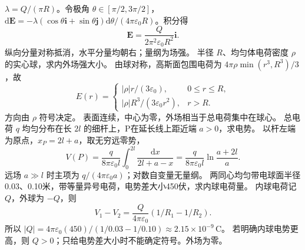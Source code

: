 \workings $\lambda=Q/(\pi R)$。令极角 $\theta\in[\pi/2,3\pi/2]$，$\mathrm d\bm E=-\lambda(\cos\theta\bm i+\sin\theta\bm j)\mathrm d\theta/(4\pi\varepsilon_0R)$。积分得
\[
\bm E=\frac{Q}{2\pi^2\varepsilon_0R^2}\bm i.
\]
\crosscheck 纵向分量对称抵消，水平分量均朝右；量纲为场强。
\problemtext 半径 $R$、均匀体电荷密度 $\rho$ 的实心球，求内外场强大小。
\workings 由球对称，高斯面包围电荷为 $4\pi\rho\min(r^3,R^3)/3$，故
\[
E(r)=\begin{cases}|\rho|r/(3\varepsilon_0),&0\le r\le R,\\
|\rho|R^3/(3\varepsilon_0r^2),&r>R.\end{cases}
\]
方向由 $\rho$ 符号决定。
\crosscheck 表面连续，中心为零，外场相当于总电荷集中在球心。
\problemtext 总电荷 $q$ 均匀分布在长 $2l$ 的细杆上，P在延长线上距近端 $a>0$，求电势。
\workings 以杆左端为原点，$x_P=2l+a$，取无穷远零势，
\[
V(P)=\frac{q}{8\pi\varepsilon_0l}\int_0^{2l}\frac{\mathrm dx}{2l+a-x}
=\frac{q}{8\pi\varepsilon_0l}\ln\frac{a+2l}{a}.
\]
\crosscheck 远场 $a\gg l$ 时主项为 $q/(4\pi\varepsilon_0a)$；对数自变量无量纲。
\problemtext 两同心均匀带电球面半径0.03、0.10米，带等量异号电荷，电势差大小450伏，求内球电荷量。
\workings 内球电荷记 $Q$，外球为 $-Q$，则
\[
V_1-V_2=\frac{Q}{4\pi\varepsilon_0}(1/R_1-1/R_2).
\]
所以 $|Q|=4\pi\varepsilon_0(450)/(1/0.03-1/0.10)\approx2.15\times10^{-9}\,\mathrm C$。
\crosscheck 若明确内球电势更高，则 $Q>0$；只给电势差大小时不能确定符号。外场为零。
